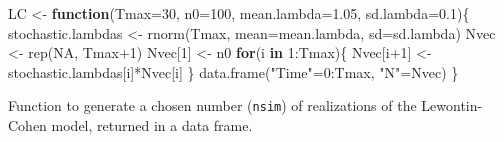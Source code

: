\documentclass[
]{book}
\newenvironment{Shaded}{\begin{snugshade}}{\end{snugshade}}
\newcommand{\AttributeTok}[1]{\textcolor[rgb]{0.77,0.63,0.00}{#1}}
\newcommand{\ConstantTok}[1]{\textcolor[rgb]{0.00,0.00,0.00}{#1}}
\newcommand{\ControlFlowTok}[1]{\textcolor[rgb]{0.13,0.29,0.53}{\textbf{#1}}}
\newcommand{\DecValTok}[1]{\textcolor[rgb]{0.00,0.00,0.81}{#1}}
\newcommand{\FloatTok}[1]{\textcolor[rgb]{0.00,0.00,0.81}{#1}}
\newcommand{\FunctionTok}[1]{\textcolor[rgb]{0.00,0.00,0.00}{#1}}
\newcommand{\NormalTok}[1]{#1}
\newcommand{\OtherTok}[1]{\textcolor[rgb]{0.56,0.35,0.01}{#1}}
\newcommand{\SpecialCharTok}[1]{\textcolor[rgb]{0.00,0.00,0.00}{#1}}
\newcommand{\StringTok}[1]{\textcolor[rgb]{0.31,0.60,0.02}{#1}}
\begin{document}
\begin{Shaded}
\begin{Highlighting}[]
\NormalTok{LC }\OtherTok{\textless{}{-}} \ControlFlowTok{function}\NormalTok{(}\AttributeTok{Tmax=}\DecValTok{30}\NormalTok{, }
               \AttributeTok{n0=}\DecValTok{100}\NormalTok{, }
               \AttributeTok{mean.lambda=}\FloatTok{1.05}\NormalTok{, }
               \AttributeTok{sd.lambda=}\FloatTok{0.1}\NormalTok{)\{}
\NormalTok{  stochastic.lambdas }\OtherTok{\textless{}{-}} \FunctionTok{rnorm}\NormalTok{(Tmax, }
                              \AttributeTok{mean=}\NormalTok{mean.lambda, }
                              \AttributeTok{sd=}\NormalTok{sd.lambda)}
\NormalTok{  Nvec }\OtherTok{\textless{}{-}} \FunctionTok{rep}\NormalTok{(}\ConstantTok{NA}\NormalTok{, Tmax}\SpecialCharTok{+}\DecValTok{1}\NormalTok{)}
\NormalTok{  Nvec[}\DecValTok{1}\NormalTok{] }\OtherTok{\textless{}{-}}\NormalTok{ n0}
  \ControlFlowTok{for}\NormalTok{(i }\ControlFlowTok{in} \DecValTok{1}\SpecialCharTok{:}\NormalTok{Tmax)\{}
\NormalTok{    Nvec[i}\SpecialCharTok{+}\DecValTok{1}\NormalTok{] }\OtherTok{\textless{}{-}}\NormalTok{ stochastic.lambdas[i]}\SpecialCharTok{*}\NormalTok{Nvec[i]}
\NormalTok{  \}}
  \FunctionTok{data.frame}\NormalTok{(}\StringTok{"Time"}\OtherTok{=}\DecValTok{0}\SpecialCharTok{:}\NormalTok{Tmax, }\StringTok{"N"}\OtherTok{=}\NormalTok{Nvec)}
\NormalTok{\}}
\end{Highlighting}
\end{Shaded}

Function to generate a chosen number (\texttt{nsim}) of realizations of the Lewontin-Cohen model, returned in a data frame.
\end{document}
